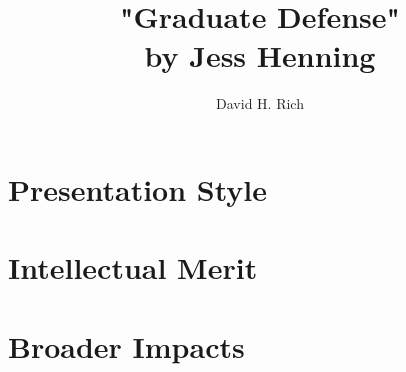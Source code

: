 \documentclass{article}
\title{ "Graduate Defense" \\ 
	by Jess Henning \\ }
\author{David H. Rich}
\date{}
\begin{document}
	\maketitle%
	\thispagestyle{empty}
	\vspace{16pt}
	
	\section{Presentation Style}
	
	
	\section{Intellectual Merit}
	
	  
	\section{Broader Impacts}
	
\end{document}
